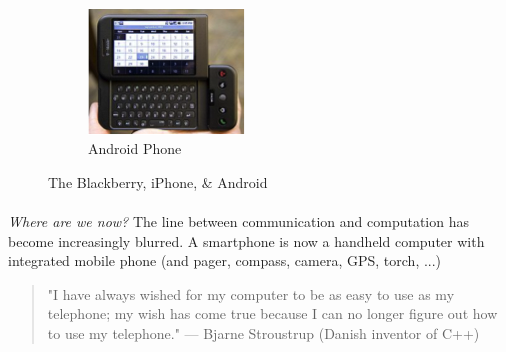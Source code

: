 \documentclass[12pt, a4paper, twoside]{book}
\begin{document}
\begin{figure}[htb]
        ~ %
        \begin{subfigure}[b]{0.3\textwidth}
                \includegraphics[width=\textwidth]{images/android-phone}
                \caption{Android Phone}
                \label{fig:android-phone}
        \end{subfigure}
        \caption{The Blackberry, iPhone, \& Android}\label{fig:early-mobile-platforms-1}
\end{figure}



\paragraph{} \emph{Where are we now?} The line between communication and computation has become increasingly blurred. A smartphone is now a handheld computer with integrated mobile phone (and pager, compass, camera, GPS, torch, ...)

\begin{quote}
"I have always wished for my computer to be as easy to use as my telephone; my wish has come true because I can no longer figure out how to use my telephone." 
— Bjarne Stroustrup  (Danish inventor of C++)
\end{quote}
\end{document}
